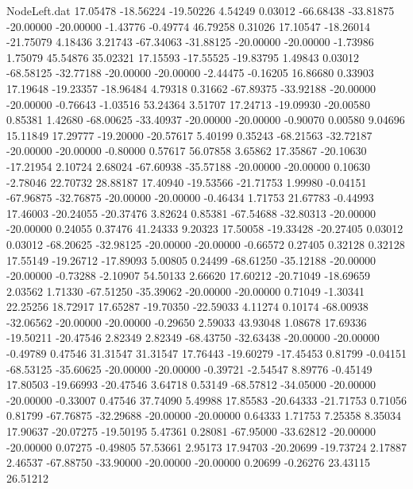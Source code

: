 \begin{filecontents}{NodeLeft.dat}
  17.05478  -18.56224  -19.50226     4.54249    0.03012  -66.68438  -33.81875  -20.00000  -20.00000   -1.43776   -0.49774   46.79258    0.31026
  17.10547  -18.26014  -21.75079     4.18436    3.21743  -67.34063  -31.88125  -20.00000  -20.00000   -1.73986    1.75079   45.54876   35.02321
  17.15593  -17.55525  -19.83795     1.49843    0.03012  -68.58125  -32.77188  -20.00000  -20.00000   -2.44475   -0.16205   16.86680    0.33903
  17.19648  -19.23357  -18.96484     4.79318    0.31662  -67.89375  -33.92188  -20.00000  -20.00000   -0.76643   -1.03516   53.24364    3.51707
  17.24713  -19.09930  -20.00580     0.85381    1.42680  -68.00625  -33.40937  -20.00000  -20.00000   -0.90070    0.00580    9.04696   15.11849
  17.29777  -19.20000  -20.57617     5.40199    0.35243  -68.21563  -32.72187  -20.00000  -20.00000   -0.80000    0.57617   56.07858    3.65862
  17.35867  -20.10630  -17.21954     2.10724    2.68024  -67.60938  -35.57188  -20.00000  -20.00000    0.10630   -2.78046   22.70732   28.88187
  17.40940  -19.53566  -21.71753     1.99980   -0.04151  -67.96875  -32.76875  -20.00000  -20.00000   -0.46434    1.71753   21.67783   -0.44993
  17.46003  -20.24055  -20.37476     3.82624    0.85381  -67.54688  -32.80313  -20.00000  -20.00000    0.24055    0.37476   41.24333    9.20323
  17.50058  -19.33428  -20.27405     0.03012    0.03012  -68.20625  -32.98125  -20.00000  -20.00000   -0.66572    0.27405    0.32128    0.32128
  17.55149  -19.26712  -17.89093     5.00805    0.24499  -68.61250  -35.12188  -20.00000  -20.00000   -0.73288   -2.10907   54.50133    2.66620
  17.60212  -20.71049  -18.69659     2.03562    1.71330  -67.51250  -35.39062  -20.00000  -20.00000    0.71049   -1.30341   22.25256   18.72917
  17.65287  -19.70350  -22.59033     4.11274    0.10174  -68.00938  -32.06562  -20.00000  -20.00000   -0.29650    2.59033   43.93048    1.08678
  17.69336  -19.50211  -20.47546     2.82349    2.82349  -68.43750  -32.63438  -20.00000  -20.00000   -0.49789    0.47546   31.31547   31.31547
  17.76443  -19.60279  -17.45453     0.81799   -0.04151  -68.53125  -35.60625  -20.00000  -20.00000   -0.39721   -2.54547    8.89776   -0.45149
  17.80503  -19.66993  -20.47546     3.64718    0.53149  -68.57812  -34.05000  -20.00000  -20.00000   -0.33007    0.47546   37.74090    5.49988
  17.85583  -20.64333  -21.71753     0.71056    0.81799  -67.76875  -32.29688  -20.00000  -20.00000    0.64333    1.71753    7.25358    8.35034
  17.90637  -20.07275  -19.50195     5.47361    0.28081  -67.95000  -33.62812  -20.00000  -20.00000    0.07275   -0.49805   57.53661    2.95173
  17.94703  -20.20699  -19.73724     2.17887    2.46537  -67.88750  -33.90000  -20.00000  -20.00000    0.20699   -0.26276   23.43115   26.51212

\end{filecontents}
